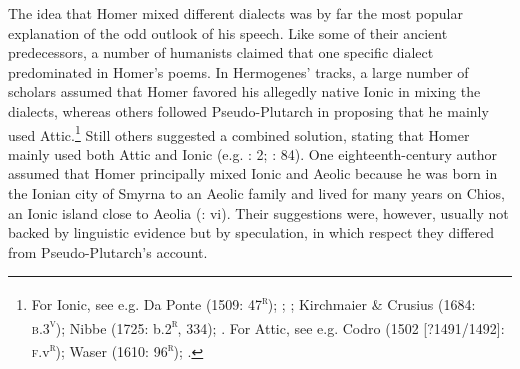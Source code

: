 \documentclass[output=paper]{langsci/langscibook}
\begin{document}
The idea that Homer mixed different dialects was by far the most popular explanation of the odd outlook of his speech. Like some of their ancient predecessors, a number of humanists claimed that one specific dialect predominated in Homer’s poems. In Hermogenes’ tracks, a large number of scholars assumed that Homer favored his allegedly native Ionic in mixing the dialects, whereas others followed Pseudo-Plutarch in proposing that he mainly used Attic.\footnote{For Ionic, see e.g. Da Ponte (1509: 47\textsc{\textsuperscript{r}}); \citet[215]{Ringelbergh1541}; \citet[167]{Labbe1639}; Kirchmaier \& Crusius (1684: \textsc{b.3}\textsc{\textsuperscript{v}}); Nibbe (1725: b.2\textsc{\textsuperscript{r}}, 334); \citet[161]{Gesner1774}. For Attic, see e.g. Codro (1502 [?1491/1492]: \textsc{f.}v\textsc{\textsuperscript{r}}); Waser (1610: 96\textsc{\textsuperscript{r}}); \citet[514]{Fabricius1711}.} Still others suggested a combined solution, stating that Homer mainly used both Attic and Ionic (e.g. \citealt{Schmidt1604}: 2; \citealt{Rhenius1626}: 84). One eighteenth-century author assumed that Homer principally mixed Ionic and Aeolic because he was born in the Ionian city of Smyrna to an Aeolic family and lived for many years on Chios, an Ionic island close to Aeolia (\citealt{Reynolds1752}: vi). Their suggestions were, however, usually not backed by linguistic evidence but by speculation, in which respect they differed from Pseudo-Plutarch’s account.
\end{document}
